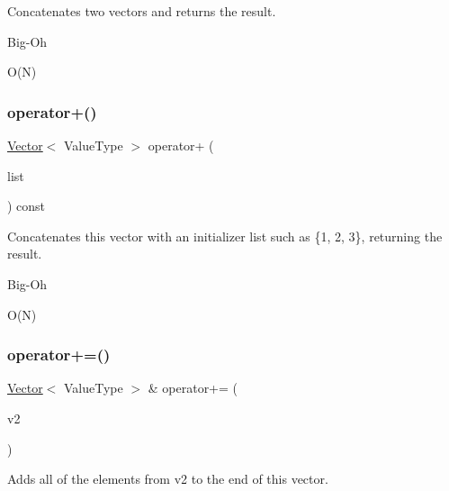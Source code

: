 Concatenates two vectors and returns the result. 

\begin{DoxyRefDesc}{Big-\/\+Oh}
\item[\mbox{\hyperlink{BigOh__BigOh000139}{Big-\/\+Oh}}]O(\+N) \end{DoxyRefDesc}
\mbox{\label{classVector_a2dce2988ba5880d744280b4bbf85b135}} 
\subsubsection{\texorpdfstring{operator+()}{operator+()}\hspace{0.1cm}{\footnotesize\ttfamily [2/2]}}
{\footnotesize\ttfamily \mbox{\hyperlink{classVector}{Vector}}$<$ Value\+Type $>$ operator+ (\begin{DoxyParamCaption}\item[{std\+::initializer\+\_\+list$<$ Value\+Type $>$}]{list }\end{DoxyParamCaption}) const}



Concatenates this vector with an initializer list such as \{1, 2, 3\}, returning the result. 

\begin{DoxyRefDesc}{Big-\/\+Oh}
\item[\mbox{\hyperlink{BigOh__BigOh000140}{Big-\/\+Oh}}]O(\+N) \end{DoxyRefDesc}
\mbox{\label{classVector_a6b35f98e0e64a2fff6891a8806f640fd}} 
\subsubsection{\texorpdfstring{operator+=()}{operator+=()}\hspace{0.1cm}{\footnotesize\ttfamily [1/3]}}
{\footnotesize\ttfamily \mbox{\hyperlink{classVector}{Vector}}$<$ Value\+Type $>$ \& operator+= (\begin{DoxyParamCaption}\item[{const \mbox{\hyperlink{classVector}{Vector}}$<$ Value\+Type $>$ \&}]{v2 }\end{DoxyParamCaption})}



Adds all of the elements from {\ttfamily v2} to the end of this vector. 

